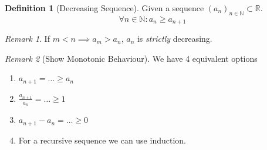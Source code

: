 \documentclass[english,titlepage]{uzhpub}
\theoremstyle{definition}
\newtheorem{definition}{Definition}[section]
\theoremstyle{plain}
\theoremstyle{remark}
\newtheorem*{remark}{Remark}
\theoremstyle{example}
\begin{document}
   \begin{definition}[Decreasing Sequence]
      Given a sequence \((a_n)_{n \in \mathbb{N}} \subset \mathbb{R}\).
      \[\forall n \in \mathbb{N}: a_n \geq a_{n+1}\]
   \end{definition}
   \begin{remark}
      If \(m < n \implies a_m > a_n\), \(a_n\) is \textit{strictly} decreasing.
   \end{remark}

   \begin{remark}[Show Monotonic Behaviour]
      We have 4 equivalent options
      \begin{enumerate}
         \item \(a_{n+1} = \ldots \geq a_n\)
         \item \(\frac{a_{n+1}}{a_n} = \ldots \geq 1\)
         \item \(a_{n+1} - a_n = \ldots \geq 0\)
         \item For a recursive sequence we can use induction.
      \end{enumerate}
   \end{remark}
\end{document}
